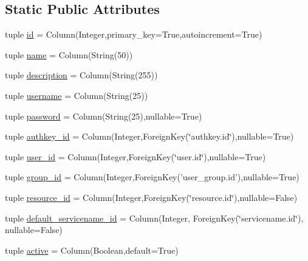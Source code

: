 \subsection*{\-Static \-Public \-Attributes}
\begin{DoxyCompactItemize}
\item 
tuple \hyperlink{classcyberweb_1_1model_1_1resource_1_1_account_a3254243dc2c884308ffa0a9d475f53ef}{id} = \-Column(\-Integer,primary\-\_\-key=\-True,autoincrement=\-True)
\item 
tuple \hyperlink{classcyberweb_1_1model_1_1resource_1_1_account_acb973290c11b506a251362832339e94a}{name} = \-Column(\-String(50))
\item 
tuple \hyperlink{classcyberweb_1_1model_1_1resource_1_1_account_a4364a02e7c375ed6f5fa933909bfff68}{description} = \-Column(\-String(255))
\item 
tuple \hyperlink{classcyberweb_1_1model_1_1resource_1_1_account_ab18baad4082a3c1ae46ffba418291734}{username} = \-Column(\-String(25))
\item 
tuple \hyperlink{classcyberweb_1_1model_1_1resource_1_1_account_a13cb87c5394b6f088e1f135c0206433f}{password} = \-Column(\-String(25),nullable=\-True)
\item 
tuple \hyperlink{classcyberweb_1_1model_1_1resource_1_1_account_a6e7586c94ea99929ecf68f724484b83a}{authkey\-\_\-id} = \-Column(\-Integer,\-Foreign\-Key(\char`\"{}authkey.\-id\char`\"{}),nullable=\-True)
\item 
tuple \hyperlink{classcyberweb_1_1model_1_1resource_1_1_account_a28ea5f1afe953dad3682a829ec35f60d}{user\-\_\-id} = \-Column(\-Integer,\-Foreign\-Key(\char`\"{}user.\-id\char`\"{}),nullable=\-True)
\item 
tuple \hyperlink{classcyberweb_1_1model_1_1resource_1_1_account_a04cab43b4a0283f876ef0cfcb1210f6e}{group\-\_\-id} = \-Column(\-Integer,\-Foreign\-Key('user\-\_\-group.\-id'),nullable=\-True)
\item 
tuple \hyperlink{classcyberweb_1_1model_1_1resource_1_1_account_a3f889ede23c9490edef175accb52637f}{resource\-\_\-id} = \-Column(\-Integer,\-Foreign\-Key(\char`\"{}resource.\-id\char`\"{}),nullable=\-False)
\item 
tuple \hyperlink{classcyberweb_1_1model_1_1resource_1_1_account_a7e10516f5731c783000d70924d5631fa}{default\-\_\-servicename\-\_\-id} = \-Column(\-Integer, \-Foreign\-Key(\char`\"{}servicename.\-id\char`\"{}), nullable=\-False)
\item 
tuple \hyperlink{classcyberweb_1_1model_1_1resource_1_1_account_ae17fca9bef83cd8b859d3c1e7bb20b58}{active} = \-Column(\-Boolean,default=\-True)

\end{DoxyCompactItemize}
